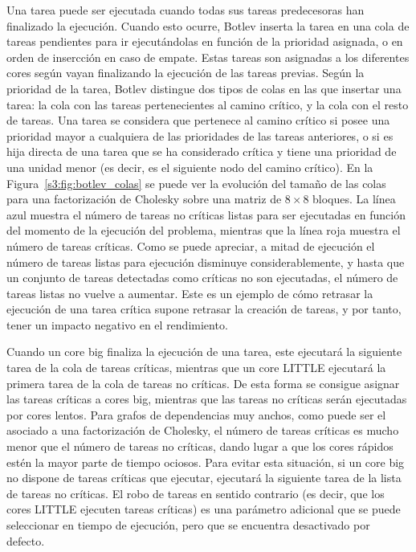 Una tarea puede ser ejecutada cuando todas sus tareas predecesoras han
finalizado la ejecución. Cuando esto ocurre, Botlev inserta la tarea en una
cola de tareas pendientes para ir ejecutándolas en función de la prioridad
asignada, o en orden de insercción en caso de empate. Estas tareas son
asignadas a los diferentes cores según vayan finalizando la ejecución de
las tareas previas. Según la prioridad de la tarea, Botlev distingue dos
tipos de colas en las que insertar una tarea: la cola con las tareas
pertenecientes al camino crítico, y la cola con el resto de tareas. Una
tarea se considera que pertenece al camino crítico si posee una prioridad
mayor a cualquiera de las prioridades de las tareas anteriores, o si es
hija directa de una tarea que se ha considerado crítica y tiene una
prioridad de una unidad menor (es decir, es el siguiente nodo del camino
crítico). En la Figura~\ref{s3:fig:botlev_colas} se puede ver la evolución
del tamaño de las colas para una factorización de Cholesky sobre una matriz
de $8\times8$ bloques. La línea azul muestra el número de tareas no
críticas listas para ser ejecutadas en función del momento de la ejecución
del problema, mientras que la línea roja muestra el número de tareas
críticas. Como se puede apreciar, a mitad de ejecución el número de tareas
listas para ejecución disminuye considerablemente, y hasta que un conjunto
de tareas detectadas como críticas no son ejecutadas, el número de tareas
listas no vuelve a aumentar. Este es un ejemplo de cómo retrasar la
ejecución de una tarea crítica supone retrasar la creación de tareas, y por
tanto, tener un impacto negativo en el rendimiento.

Cuando un core big finaliza la ejecución de una tarea, este ejecutará la
siguiente tarea de la cola de tareas críticas, mientras que un core LITTLE
ejecutará la primera tarea de la cola de tareas no críticas. De esta forma
se consigue asignar las tareas críticas a cores big, mientras que las
tareas no críticas serán ejecutadas por cores lentos. Para grafos de
dependencias muy anchos, como puede ser el asociado a una factorización de
Cholesky, el número de tareas críticas es mucho menor que el número de
tareas no críticas, dando lugar a que los cores rápidos estén la mayor
parte de tiempo ociosos. Para evitar esta situación, si un core big no
dispone de tareas críticas que ejecutar, ejecutará la siguiente tarea de la
lista de tareas no críticas. El robo de tareas en sentido contrario (es
decir, que los cores LITTLE ejecuten tareas críticas) es una parámetro
adicional que se puede seleccionar en tiempo de ejecución, pero que se
encuentra desactivado por defecto.




